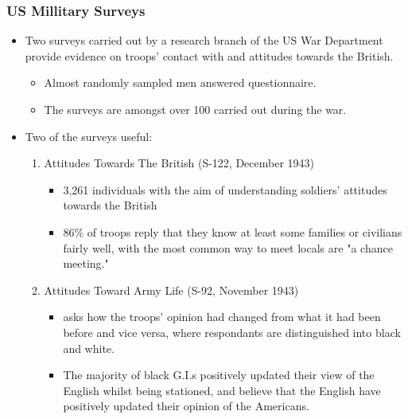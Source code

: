 \documentclass[dvipdfmx,11pt]{beamer}
\begin{document}
\begin{frame}\frametitle{US Millitary Surveys}
  \begin{itemize}
    \item Two surveys carried out by a research branch of the US War Department provide evidence on troops' contact with and attitudes towards the British.
    \begin{itemize}
      \item Almost randomly sampled men answered questionnaire.
      \item The surveys are amongst over 100 carried out during the war.
    \end{itemize}
    \item Two of the surveys useful:
    \begin{enumerate}
      \item Attitudes Towards The British (S-122, December 1943)
      \begin{itemize}
        \item 3,261 individuals with the aim of understanding soldiers' attitudes towards the British
        \item 86\% of troops reply that they know at least some families or civilians fairly well, with the most common way to meet locals are "a chance meeting."
      \end{itemize}
      \item Attitudes Toward Army Life (S-92, November 1943)
      \begin{itemize}
        \item asks how the troops' opinion had changed from what it had been before and vice versa, where respondants are distinguished into black and white.
        \item The majority of black G.I.s positively updated their view of the English whilst being stationed, and believe that the English have positively updated their opinion of the Americans.
      \end{itemize}
    \end{enumerate}
  \end{itemize}
\end{frame}
\end{document}
